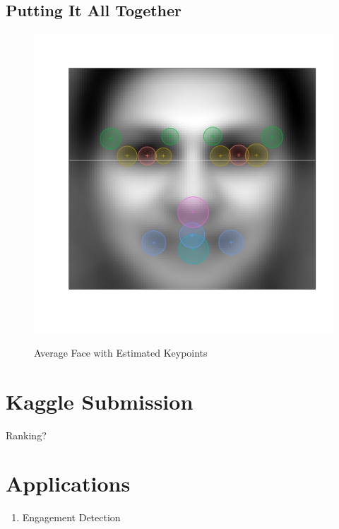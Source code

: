 \documentclass[journal]{IEEEtran}
\begin{document}
\subsection{Putting It All Together}
\begin{figure}[!htb]
  \centering
  \caption{Average Face with Estimated Keypoints}
  \includegraphics[scale=.5]{avg_face_rmse.pdf}
  \label{fig:avg_face_rmse}
\end{figure}

\section{Kaggle Submission}
Ranking?

\section{Applications}
\begin{enumerate}
\item Engagement Detection
\end{enumerate}

\medskip


% 

\end{document}
